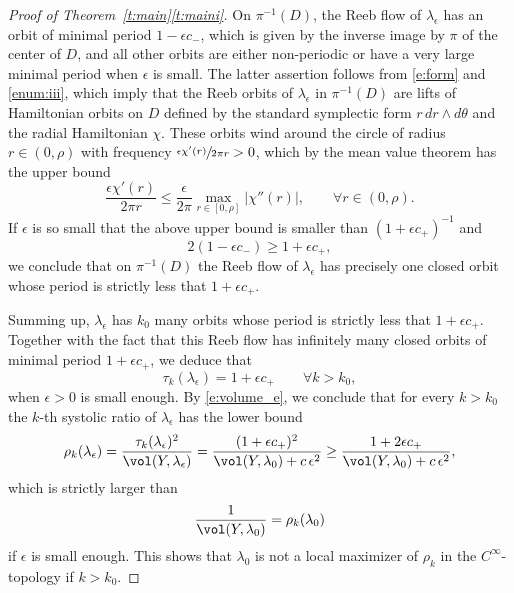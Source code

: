 \begin{proof}[Proof of Theorem~\ref{t:main}\eqref{t:maini}]
On $\pi^{-1}(D)$, the Reeb flow of $\lambda_{\epsilon}$ has an orbit of minimal period $1-\epsilon c_-$, which is given by the inverse image by $\pi$ of the center of $D$, and all other orbits are either non-periodic or have a very large minimal period when $\epsilon$ is small. The latter assertion follows from \eqref{e:form} and \eqref{enum:iii}, which imply that the Reeb orbits of $\lambda_{\epsilon}$ in $\pi^{-1}(D)$ are lifts of Hamiltonian orbits on $D$ defined by the standard symplectic form $r\, dr\wedge d\theta$ and the radial Hamiltonian $\chi$. These orbits
wind around the circle of radius $r\in (0,\rho)$ with frequency $\sfrac{\epsilon \chi'(r)}{2\pi r}>0$, which by the mean value theorem has the upper bound
\[
\frac{\epsilon \chi'(r)}{2\pi r} \leq \frac{\epsilon}{2\pi} \max_{r\in [0,\rho]} |\chi''(r)|, \qquad \forall r\in (0,\rho).
\]
If $\epsilon$ is so small that the above upper bound is smaller than $(1+\epsilon c_+)^{-1}$ and
\[
2(1-\epsilon c_-) \geq 1+\epsilon c_+,
\]
we conclude that on $\pi^{-1}(D)$ the Reeb flow of $\lambda_{\epsilon}$ has precisely one closed orbit whose period is strictly less that $1+ \epsilon c_+$.

Summing up, $\lambda_{\epsilon}$ has $k_0$ many orbits whose period is strictly less that $1+ \epsilon c_+$. Together with the fact that this Reeb flow has infinitely many closed orbits of minimal period $1+\epsilon c_+$, we deduce that\vspace*{-3pt}
\[
\tau_k(\lambda_{\epsilon}) = 1+\epsilon c_+ \qquad \forall k> k_0,
\]
when $\epsilon>0$ is small enough. By \eqref{e:volume_e}, we conclude that for every $k> k_0$ the $k$-th systolic ratio of $\lambda_{\epsilon}$ has the lower bound
\[
\rho_k(\lambda_{\epsilon}) = \frac{\tau_k(\lambda_{\epsilon})^2}{\vol(Y,\lambda_{\epsilon})} = \frac{(1+\epsilon c_+)^2}{\vol(Y,\lambda_0) + c\, \epsilon^2} \geq \frac{1+2 \epsilon c_+}{\vol(Y,\lambda_0) + c\, \epsilon^2},
\]
which is strictly larger than\vspace*{-3pt}
\[
\frac{1}{\vol(Y,\lambda_0)} = \rho_k(\lambda_0)
\]
if $\epsilon$ is small enough. This shows that $\lambda_0$ is not a local maximizer of $\rho_k$ in the $C^{\infty}$\nobreakdash-topo\-logy if $k> k_0$.
\end{proof}

